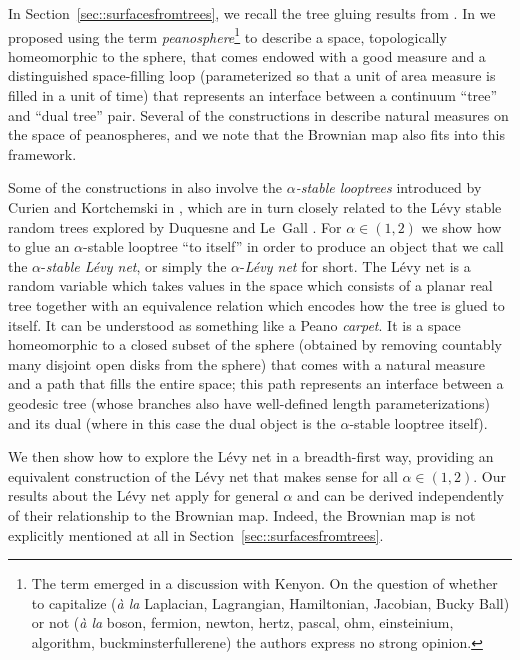 \documentclass[JEP,XML,SOM,Unicode]{cedram}
\theoremstyle{plain}
\numberwithin{theorem}{section}
\theoremstyle{definition}
\begin{document}
In Section~\ref{sec::surfacesfromtrees}, we recall the tree gluing results from \cite{matingtrees}. In \cite{matingtrees} we proposed using the term \emph{peanosphere}\footnote{The term emerged in a discussion with Kenyon. On the question of whether to capitalize (\emph{à la} Laplacian, Lagrangian, Hamiltonian, Jacobian, Bucky Ball) or not (\emph{à la} boson, fermion, newton, hertz, pascal, ohm, einsteinium, algorithm, buckminsterfullerene) the authors express no strong opinion.} to describe a space, topologically homeomorphic to the sphere, that comes endowed with a good measure and a distinguished space-filling loop (parameterized so that a unit of area measure is filled in a unit of time) that represents an interface between a continuum ``tree'' and ``dual tree'' pair. Several of the constructions in \cite{matingtrees} describe natural measures on the space of peanospheres, and we note that the Brownian map also fits into this framework.

Some of the constructions in \cite{matingtrees} also involve the \emph{$\alpha$-stable looptrees} introduced by Curien and Kortchemski in \cite{ck2013looptrees}, which are in turn closely related to the Lévy stable random trees explored by Duquesne and Le~Gall \cite{dlg2002trees_levy, duquesnelegall2005levytrees, duquesnelegallhausdorff, duquesnelegallrerooting}. For $\alpha \in (1,2)$ we show how to glue an $\alpha$-stable looptree ``to itself'' in order to produce an object that we call the $\alpha$-\emph{stable Lévy net}, or simply the $\alpha$-\emph{Lévy net} for short. The Lévy net is a random variable which takes values in the space which consists of a planar real tree together with an equivalence relation which encodes how the tree is glued to itself. It can be understood as something like a Peano \emph{carpet}. It is a space homeomorphic to a closed subset of the sphere (obtained by removing countably many disjoint open disks from the sphere) that comes with a natural measure and a path that fills the entire space; this path represents an interface between a geodesic tree (whose branches also have well-defined length parameterizations) and its dual (where in this case the dual object is the $\alpha$-stable looptree itself).

We then show how to explore the Lévy net in a breadth-first way, providing an equivalent construction of the Lévy net that makes sense for all $\alpha \in (1,2)$. Our results about the Lévy net apply for general $\alpha$ and can be derived independently of their relationship to the Brownian map. Indeed, the Brownian map is not explicitly mentioned at all in Section~\ref{sec::surfacesfromtrees}.\enlargethispage{\baselineskip}%
\end{document}
